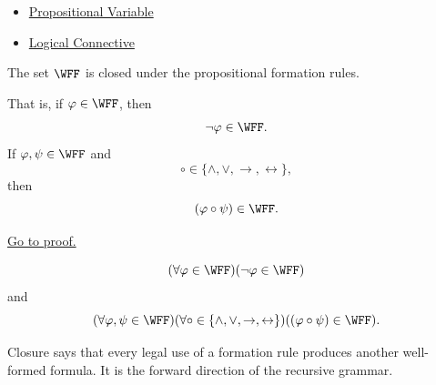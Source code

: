 \begin{dependencies}
\begin{itemize}
  \item \hyperref[def:propositional-variable]{Propositional Variable}
  \item \hyperref[def:logical-connective]{Logical Connective}
\end{itemize}
\end{dependencies}
\begin{tcolorbox}[colback=lembox, colframe=lemborder, arc=2pt,
  left=6pt, right=6pt, top=4pt, bottom=4pt,
  title={\small\textbf{Lemma (Closure Under Formation)}},
  fonttitle=\small\bfseries]
\begin{lemma}
\label{lem:closure-under-formation-propositional-formulas}
The set \(\WFF\) is closed under the propositional formation rules.

That is, if \(\varphi\in\WFF\), then
\[
\neg\varphi\in\WFF.
\]
If \(\varphi,\psi\in\WFF\) and
\[
\circ\in\{\land,\lor,\to,\leftrightarrow\},
\]
then
\[
(\varphi\circ\psi)\in\WFF.
\]

\noindent\hyperref[prf:closure-under-formation-propositional-formulas]{Go to proof.}
\end{lemma}
\end{tcolorbox}

\begin{remark*}
\[
(\forall\varphi\in\WFF)(\neg\varphi\in\WFF)
\]
and
\[
(\forall\varphi,\psi\in\WFF)
(\forall\circ\in\{\land,\lor,\to,\leftrightarrow\})
((\varphi\circ\psi)\in\WFF).
\]
\end{remark*}

\begin{remark*}[Interpretation]
Closure says that every legal use of a formation rule produces another
well-formed formula. It is the forward direction of the recursive grammar.
\end{remark*}

